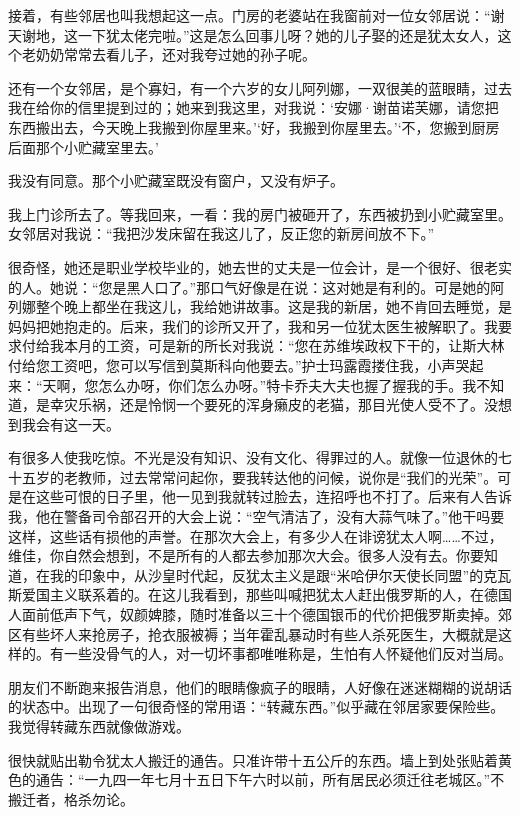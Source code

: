 接着，有些邻居也叫我想起这一点。门房的老婆站在我窗前对一位女邻居说：“谢天谢地，这一下犹太佬完啦。”这是怎么回事儿呀？她的儿子娶的还是犹太女人，这个老奶奶常常去看儿子，还对我夸过她的孙子呢。

还有一个女邻居，是个寡妇，有一个六岁的女儿阿列娜，一双很美的蓝眼睛，过去我在给你的信里提到过的；她来到我这里，对我说：‘安娜·谢苗诺芙娜，请您把东西搬出去，今天晚上我搬到你屋里来。’‘好，我搬到你屋里去。’‘不，您搬到厨房后面那个小贮藏室里去。’

我没有同意。那个小贮藏室既没有窗户，又没有炉子。

我上门诊所去了。等我回来，一看：我的房门被砸开了，东西被扔到小贮藏室里。女邻居对我说：“我把沙发床留在我这儿了，反正您的新房间放不下。”

很奇怪，她还是职业学校毕业的，她去世的丈夫是一位会计，是一个很好、很老实的人。她说：“您是黑人口了。”那口气好像是在说：这对她是有利的。可是她的阿列娜整个晚上都坐在我这儿，我给她讲故事。这是我的新居，她不肯回去睡觉，是妈妈把她抱走的。后来，我们的诊所又开了，我和另一位犹太医生被解职了。我要求付给我本月的工资，可是新的所长对我说：“您在苏维埃政权下干的，让斯大林付给您工资吧，您可以写信到莫斯科向他要去。”护士玛露霞搂住我，小声哭起来：“天啊，您怎么办呀，你们怎么办呀。”特卡乔夫大夫也握了握我的手。我不知道，是幸灾乐祸，还是怜悯一个要死的浑身癞皮的老猫，那目光使人受不了。没想到我会有这一天。

有很多人使我吃惊。不光是没有知识、没有文化、得罪过的人。就像一位退休的七十五岁的老教师，过去常常问起你，要我转达他的问候，说你是“我们的光荣”。可是在这些可恨的日子里，他一见到我就转过脸去，连招呼也不打了。后来有人告诉我，他在警备司令部召开的大会上说：“空气清洁了，没有大蒜气味了。”他干吗要这样，这些话有损他的声誉。在那次大会上，有多少人在诽谤犹太人啊……不过，维佳，你自然会想到，不是所有的人都去参加那次大会。很多人没有去。你要知道，在我的印象中，从沙皇时代起，反犹太主义是跟“米哈伊尔天使长同盟”的克瓦斯爱国主义联系着的。在这儿我看到，那些叫喊把犹太人赶出俄罗斯的人，在德国人面前低声下气，奴颜婢膝，随时准备以三十个德国银币的代价把俄罗斯卖掉。郊区有些坏人来抢房子，抢衣服被褥；当年霍乱暴动时有些人杀死医生，大概就是这样的。有一些没骨气的人，对一切坏事都唯唯称是，生怕有人怀疑他们反对当局。

朋友们不断跑来报告消息，他们的眼睛像疯子的眼睛，人好像在迷迷糊糊的说胡话的状态中。出现了一句很奇怪的常用语：“转藏东西。”似乎藏在邻居家要保险些。我觉得转藏东西就像做游戏。

很快就贴出勒令犹太人搬迁的通告。只准许带十五公斤的东西。墙上到处张贴着黄色的通告：“一九四一年七月十五日下午六时以前，所有居民必须迁往老城区。”不搬迁者，格杀勿论。

